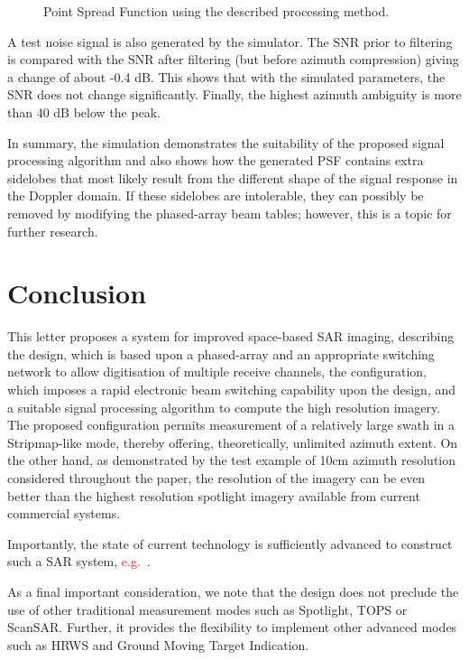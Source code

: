 \documentclass[journal]{IEEEtran}
\newcommand{\cg}[1]{\textcolor{red}{#1}}
\begin{document}
\begin{figure}[h!]
\begin{center}
 \resizebox{\columnwidth}{!}{}
 \caption{Point Spread Function using the described processing method.}
 \label{fg:psf}
 \end{center}
\end{figure}
\par
A test noise signal is also generated by the simulator. The SNR prior to filtering is compared with the SNR after filtering (but before azimuth compression) giving a change of about -0.4 dB. This shows that with the simulated parameters, the SNR does not change significantly. Finally, the highest azimuth ambiguity is more than 40 dB below the peak.
\par
In summary, the simulation demonstrates the suitability of the proposed signal processing algorithm and also shows how the generated PSF contains extra sidelobes that most likely result from the different shape of the signal response in the Doppler domain. If these sidelobes are intolerable, they can possibly be removed by modifying the phased-array beam tables; however, this is a topic for further research.


\section{Conclusion}
This letter proposes a system for improved space-based SAR imaging, describing the design, which is based upon a phased-array and an appropriate switching network to allow digitisation of multiple receive channels, the configuration, which imposes a rapid electronic beam switching capability upon the design, and a suitable signal processing algorithm to compute the high resolution imagery. The proposed configuration permits measurement of a relatively large swath in a Stripmap-like mode, thereby offering, theoretically, unlimited azimuth extent. On the other hand, as demonstrated by the test example of 10cm azimuth resolution considered throughout the paper, the resolution of the imagery can be even better than the highest resolution spotlight imagery available from current commercial systems.
\par
Importantly, the state of current technology is sufficiently advanced to construct such a SAR system, \cg{e.g.~\cite{7944492}}.
\par
As a final important consideration, we note that the design does not preclude the use of other traditional measurement modes such as Spotlight, TOPS or ScanSAR. Further, it provides the flexibility to implement other advanced modes such as HRWS and Ground Moving Target Indication.



\end{document}
